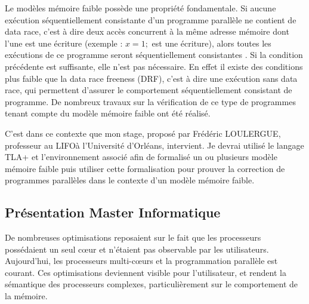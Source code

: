 \documentclass[12pt,a4paper]{article}
\begin{document}
Le modèles mémoire faible possède une propriété fondamentale. Si aucune exécution séquentiellement consistante d'un programme parallèle ne contient de data race, c'est à dire deux accès concurrent  à la même adresse mémoire dont l'une est une écriture (exemple : $x = 1;$ est une écriture), alors toutes les exécutions de ce programme seront séquentiellement consistantes \cite{Saraswat:2007:TMM:1229428.1229469}.
Si la condition précédente est suffisante, elle n'est pas nécessaire. En effet il existe des conditions plus faible que la data race freeness (DRF), c'est à dire une exécution sans data race, qui permettent d'assurer le comportement séquentiellement consistant de programme. De nombreux travaux sur la vérification de ce type de programmes tenant compte du modèle mémoire faible ont été réalisé.

C'est dans ce contexte que mon stage, proposé par Frédéric LOULERGUE, professeur au LIFO\footnotemark[1] à l'Université d'Orléans, intervient. Je devrai utilisé le langage TLA+ \cite{Lamport:2002:SST:579617} et l'environnement associé afin de formalisé un ou plusieurs modèle mémoire faible puis utiliser cette formalisation pour prouver la correction de programmes parallèles dans le contexte d'un modèle mémoire faible. 
  
\subsection{Présentation Master Informatique}

De nombreuses optimisations reposaient sur le fait que les processeurs possédaient un seul cœur et n'étaient pas observable par les utilisateurs.
Aujourd'hui, les processeurs multi-cœurs et la programmation parallèle est courant. Ces optimisations deviennent visible pour l'utilisateur, et rendent la sémantique des processeurs complexes, particulièrement sur le comportement de la mémoire.
\end{document}
